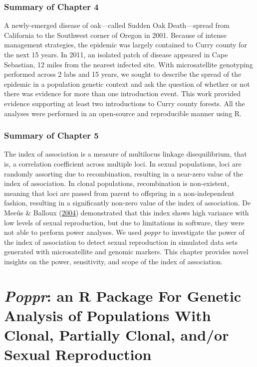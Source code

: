 \documentclass[double,11pt]{beavtex}
\begin{document}
  \subsection{Summary of Chapter 4}\label{summary-of-chapter-4}
  
  A newly-emerged disease of oak---called Sudden Oak Death---spread from
  California to the Southwest corner of Oregon in 2001. Because of intense
  management strategies, the epidemic was largely contained to Curry
  county for the next 15 years. In 2011, an isolated patch of disease
  appeared in Cape Sebastian, 12 miles from the nearest infected site.
  With microsatellite genotyping performed across 2 labs and 15 years, we
  sought to describe the spread of the epidemic in a population genetic
  context and ask the question of whether or not there was evidence for
  more than one introduction event. This work provided evidence supporting
  at least two introductions to Curry county forests. All the analyses
  were performed in an open-source and reproducible manner using R.
  
  \subsection{Summary of Chapter 5}\label{summary-of-chapter-5}
  
  The index of association is a measure of multilocus linkage
  disequilibrium, that is, a correlation coefficient across multiple loci.
  In sexual populations, loci are randomly assorting due to recombination,
  resulting in a near-zero value of the index of association. In clonal
  populations, recombination is non-existent, meaning that loci are passed
  from parent to offspring in a non-independent fashion, resulting in a
  significantly non-zero value of the index of association. De Meeûs \&
  Balloux (\protect\hyperlink{ref-de2004clonal}{2004}) demonstrated that
  this index shows high variance with low levels of sexual reproduction,
  but due to limitations in software, they were not able to perform power
  analyses. We used \emph{poppr} to investigate the power of the index of
  association to detect sexual reproduction in simulated data sets
  generated with microsatellite and genomic markers. This chapter provides
  novel insights on the power, sensitivity, and scope of the index of
  association.
  
  \chapter{\texorpdfstring{\emph{Poppr}: an R Package For Genetic Analysis
  of Populations With Clonal, Partially Clonal, and/or Sexual
  Reproduction}{Poppr: an R Package For Genetic Analysis of Populations With Clonal, Partially Clonal, and/or Sexual Reproduction}}\label{poppr-an-r-package-for-genetic-analysis-of-populations-with-clonal-partially-clonal-andor-sexual-reproduction}
  
\end{document}
